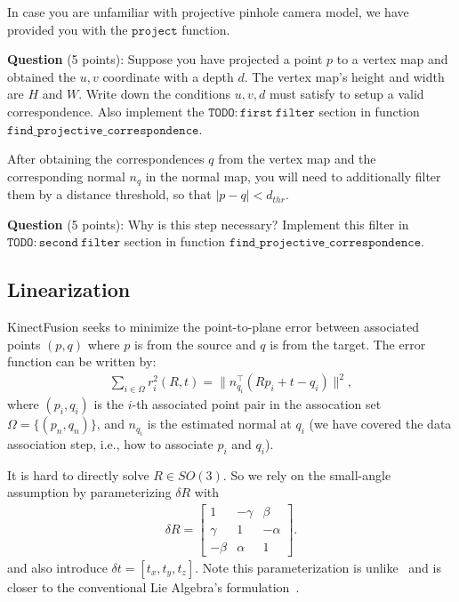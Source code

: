 \documentclass[12pt, a4paper]{article}
\begin{document}
In case you are unfamiliar with projective pinhole camera model, we have provided you with the $\mathtt{project}$ function.

\textbf{Question} (5 points): Suppose you have projected a point $p$ to a vertex map and obtained the $u, v$ coordinate with a depth $d$. The vertex map's height and width are $H$ and $W$. Write down the conditions $u, v, d$ must satisfy to setup a valid correspondence. Also implement the $\mathtt{TODO: first~filter}$ section in function $\mathtt{find\_projective\_correspondence}$.

After obtaining the correspondences $q$ from the vertex map and the corresponding normal $n_q$ in the normal map, you will need to additionally filter them by a distance threshold, so that $|p - q| < d_{thr}$.

\textbf{Question} (5 points): Why is this step necessary? Implement this filter in $\mathtt{TODO: second~filter}$ section in function $\mathtt{find\_projective\_correspondence}$.

\subsection{Linearization}
KinectFusion seeks to minimize the point-to-plane error between associated points $(p, q)$ where $p$ is from the source and $q$ is from the target. The error function can be written by:
\begin{align}
    \sum_{i \in \Omega} r_i^2(R, t) = \bigg\lVert n_{q_i}^\top (Rp_i + t - q_i)\bigg\rVert^2,
\end{align}
where $(p_i, q_i)$ is the $i$-th associated point pair in the assocation set $\Omega = \{(p_n, q_n)\}$, and $n_{q_i}$ is the estimated normal at $q_i$ (we have covered the data association step, i.e., how to associate $p_i$ and $q_i$).

It is hard to directly solve $R \in SO(3)$. So we rely on the small-angle assumption by parameterizing $\delta R$ with
\begin{align}
    \delta R = \begin{bmatrix}
        1 & -\gamma & \beta \\
        \gamma & 1 & -\alpha \\
        -\beta & \alpha & 1
    \end{bmatrix}.
\end{align}
and also introduce $\delta t = [t_x, t_y, t_z]$.
Note this parameterization is unlike~\cite{icp} and is closer to the conventional Lie Algebra's formulation~\cite{sola2018micro}.
\end{document}
